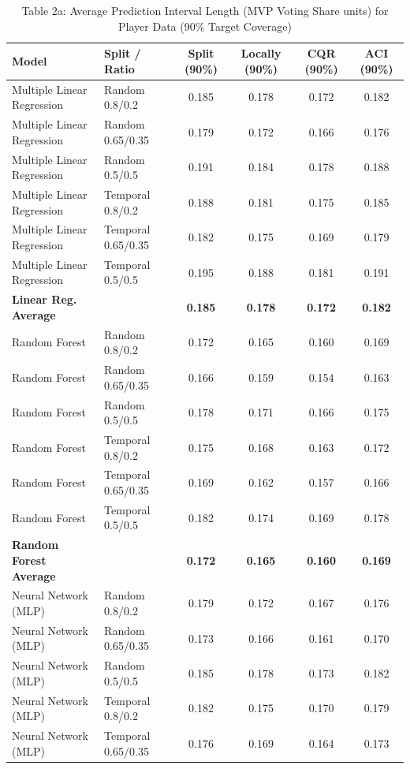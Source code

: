 \documentclass[11pt,a4paper]{article}
\begin{document}
\begin{table}[H]
\centering
\caption{Table 2a: Average Prediction Interval Length (MVP Voting Share units) for Player Data (90\% Target Coverage)}
\label{tab:mvp_tab2a}
\scriptsize
\begin{tabular}{llcccc}
\toprule
Model & Split / Ratio & Split (90\%) & Locally (90\%) & CQR (90\%) & ACI (90\%) \\
\midrule
Multiple Linear Regression & Random 0.8/0.2 & 0.185 & 0.178 & 0.172 & 0.182 \\
Multiple Linear Regression & Random 0.65/0.35 & 0.179 & 0.172 & 0.166 & 0.176 \\
Multiple Linear Regression & Random 0.5/0.5 & 0.191 & 0.184 & 0.178 & 0.188 \\
Multiple Linear Regression & Temporal 0.8/0.2 & 0.188 & 0.181 & 0.175 & 0.185 \\
Multiple Linear Regression & Temporal 0.65/0.35 & 0.182 & 0.175 & 0.169 & 0.179 \\
Multiple Linear Regression & Temporal 0.5/0.5 & 0.195 & 0.188 & 0.181 & 0.191 \\
\textbf{Linear Reg. Average} & & \textbf{0.185} & \textbf{0.178} & \textbf{0.172} & \textbf{0.182} \\
\midrule
Random Forest & Random 0.8/0.2 & 0.172 & 0.165 & 0.160 & 0.169 \\
Random Forest & Random 0.65/0.35 & 0.166 & 0.159 & 0.154 & 0.163 \\
Random Forest & Random 0.5/0.5 & 0.178 & 0.171 & 0.166 & 0.175 \\
Random Forest & Temporal 0.8/0.2 & 0.175 & 0.168 & 0.163 & 0.172 \\
Random Forest & Temporal 0.65/0.35 & 0.169 & 0.162 & 0.157 & 0.166 \\
Random Forest & Temporal 0.5/0.5 & 0.182 & 0.174 & 0.169 & 0.178 \\
\textbf{Random Forest Average} & & \textbf{0.172} & \textbf{0.165} & \textbf{0.160} & \textbf{0.169} \\
\midrule
Neural Network (MLP) & Random 0.8/0.2 & 0.179 & 0.172 & 0.167 & 0.176 \\
Neural Network (MLP) & Random 0.65/0.35 & 0.173 & 0.166 & 0.161 & 0.170 \\
Neural Network (MLP) & Random 0.5/0.5 & 0.185 & 0.178 & 0.173 & 0.182 \\
Neural Network (MLP) & Temporal 0.8/0.2 & 0.182 & 0.175 & 0.170 & 0.179 \\
Neural Network (MLP) & Temporal 0.65/0.35 & 0.176 & 0.169 & 0.164 & 0.173 \\

\end{tabular}
\end{table}
\end{document}
